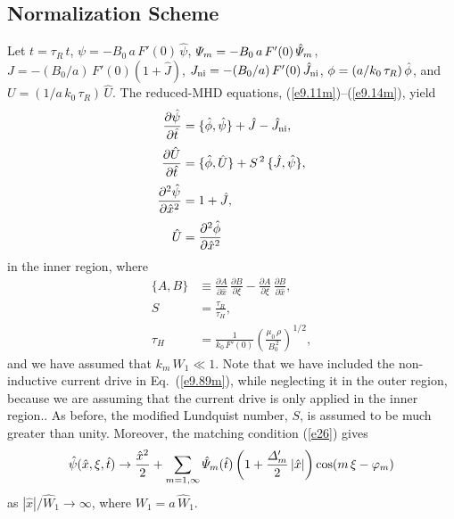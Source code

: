 \documentclass[12pt,prb,aps]{revtex4-1}
\begin{document}
\subsection{Normalization Scheme}
Let $t=\tau_R\,\hat{t}$, $\psi= -B_0\,a\,F'(0)\,\hat{\psi}$, ${\mit\Psi}_m = -B_0\,a\,F'(0)\,\hat{\mit\Psi}_m$, $J=-(B_0/a)\,F'(0)(1+\hat{J})$, $J_{\rm ni} =-(B_0/a)\,F'(0)\,\hat{J}_{\rm ni}$, $\phi= (a/k_0\,\tau_R)\,\skew{3}\hat{\phi}$, and
$U= (1/a\,k_0\,\tau_R)\,\hat{U}$. The reduced-MHD equations, (\ref{e9.11m})--(\ref{e9.14m}), yield
\begin{align}
\frac{\partial\hat{\psi}}{\partial\hat{t}}&=\{\skew{3}\hat{\phi},\hat{\psi}\}+\hat{J}-\hat{J}_{\rm ni},\label{e9.89m}\\[0.5ex]
\frac{\partial\hat{U}}{\partial\hat{t}}&= \{\skew{3}\hat{\phi},\hat{U}\}+S^{\,2}\,\{\hat{J},\hat{\psi}\},\label{e9.90}\\[0.5ex]
\frac{\partial^2\hat{\psi}}{\partial \hat{x}^2} &= 1 + \hat{J},\label{e9.91}\\[0.5ex]
\hat{U}&=\frac{\partial^2 \skew{3}\hat{\phi}}{\partial \hat{x}^2}\label{e9.92m}
\end{align}
in the inner region, 
where
\begin{align}
\{A, B\} &\equiv \frac{\partial A}{\partial\hat{x}}\,\frac{\partial B}{\partial\xi} - \frac{\partial A}{\partial\xi}\,\frac{\partial B}{\partial\hat{x}},\\[0.5ex]
S &=\frac{\tau_R}{\tau_H},\\[0.5ex]
\tau_H &= \frac{1}{k_0\,F'(0)}\left(\frac{\mu_0\,\rho}{B_0^{\,2}}\right)^{1/2},
\end{align}
and we have assumed that $k_m\,W_1\ll 1$. Note that we  have included the non-inductive current
drive in Eq.~(\ref{e9.89m}), while neglecting it in the outer region,  because we are assuming that the current drive is only applied in the inner region.. 
As before, the modified Lundquist number, $S$, is assumed to be much greater than unity. 
Moreover, the matching condition (\ref{e26}) gives
\begin{equation}\label{e34}
\hat{\psi}(\hat{x},\xi,\hat{t}) \rightarrow \frac{\hat{x}^2}{2}+ \sum_{m=1,\infty}\hat{\mit\Psi}_m(\hat{t})\left(1+\frac{{\mit\Delta}_m'}{2}\,|\hat{x}|\right)\cos(m\,\xi-\varphi_m)
\end{equation}
as $|\hat{x}|/\hat{W}_1\rightarrow \infty$, where $W_1=a\,\hat{W}_1$. 
\end{document}
